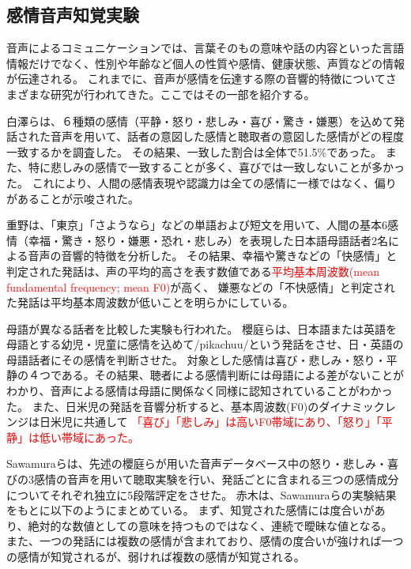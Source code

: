 \subsection{感情音声知覚実験}
\label{sec:PreviousStudy}
音声によるコミュニケーションでは、言葉そのもの意味や話の内容といった言語情報だけでなく、性別や年齢など個人の性質や感情、健康状態、声質などの情報が伝達される。
これまでに、音声が感情を伝達する際の音響的特徴についてさまざまな研究が行われてきた。ここではその一部を紹介する。

白澤らは、６種類の感情（平静・怒り・悲しみ・喜び・驚き・嫌悪）を込めて発話された音声を用いて、話者の意図した感情と聴取者の意図した感情がどの程度一致するかを調査した\cite{shirasawa1996Emo}。
その結果、一致した割合は全体で51.5\%であった。
また、特に悲しみの感情で一致することが多く、喜びでは一致しないことが多かった。
これにより、人間の感情表現や認識力は全ての感情に一様ではなく、偏りがあることが示唆された。

重野は、「東京」「さようなら」などの単語および短文を用いて、人間の基本6感情（幸福・驚き・怒り・嫌悪・恐れ・悲しみ）を表現した日本語母語話者2名による音声の音響的特徴を分析した\cite{shigeno2004Emo}。
その結果、幸福や驚きなどの「快感情」と判定された発話は、声の平均的高さを表す数値である\textcolor{red}{平均基本周波数(mean fundamental frequency; mean F0)}が高く、
嫌悪などの「不快感情」と判定された発話は平均基本周波数が低いことを明らかにしている。

母語が異なる話者を比較した実験も行われた。
櫻庭らは、日本語または英語を母語とする幼児・児童に感情を込めて/pikachuu/という発話をさせ、日・英語の母語話者にその感情を判断させた\cite{sakuraba2004Emo}。
対象とした感情は喜び・悲しみ・怒り・平静の４つである。その結果、聴者による感情判断には母語による差がないことがわかり、音声による感情は母語に関係なく同様に認知されていることがわかった。
また、日米児の発話を音響分析すると、基本周波数(F0)のダイナミックレンジは日米児に共通して%
\textcolor{red}{「喜び」「悲しみ」は高いF0帯域にあり、「怒り」「平静」は低い帯域にあった。}

Sawamuraらは、先述の櫻庭らが用いた音声データベース中の怒り・悲しみ・喜びの3感情の音声を用いて聴取実験を行い、発話ごとに含まれる三つの感情成分についてそれぞれ独立に5段階評定をさせた\cite{sawamura2007Emo}。
赤木は、Sawamuraらの実験結果をもとに以下のようにまとめている\cite{akagi2010EmoSpace}。
まず、知覚された感情には度合いがあり、絶対的な数値としての意味を持つものではなく、連続で曖昧な値となる。
また、一つの発話には複数の感情が含まれており、感情の度合いが強ければ一つの感情が知覚されるが、弱ければ複数の感情が知覚される。


